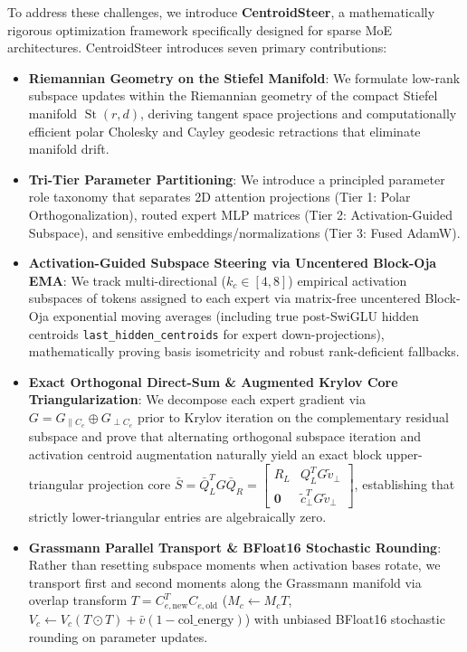 \documentclass[10pt,twocolumn,letterpaper]{article}
\begin{document}
To address these challenges, we introduce \textbf{CentroidSteer}, a mathematically rigorous optimization framework specifically designed for sparse MoE architectures. CentroidSteer introduces seven primary contributions:
\begin{itemize}
    \item \textbf{Riemannian Geometry on the Stiefel Manifold}: We formulate low-rank subspace updates within the Riemannian geometry of the compact Stiefel manifold $\operatorname{St}(r, d)$, deriving tangent space projections and computationally efficient polar Cholesky and Cayley geodesic retractions that eliminate manifold drift.
    \item \textbf{Tri-Tier Parameter Partitioning}: We introduce a principled parameter role taxonomy that separates 2D attention projections (Tier 1: Polar Orthogonalization), routed expert MLP matrices (Tier 2: Activation-Guided Subspace), and sensitive embeddings/normalizations (Tier 3: Fused AdamW).
    \item \textbf{Activation-Guided Subspace Steering via Uncentered Block-Oja EMA}: We track multi-directional ($k_c \in [4, 8]$) empirical activation subspaces of tokens assigned to each expert via matrix-free uncentered Block-Oja exponential moving averages (including true post-SwiGLU hidden centroids \texttt{last\_hidden\_centroids} for expert down-projections), mathematically proving basis isometricity and robust rank-deficient fallbacks.
    \item \textbf{Exact Orthogonal Direct-Sum \& Augmented Krylov Core Triangularization}: We decompose each expert gradient via $G = G_{\parallel C_e} \oplus G_{\perp C_e}$ prior to Krylov iteration on the complementary residual subspace and prove that alternating orthogonal subspace iteration and activation centroid augmentation naturally yield an exact block upper-triangular projection core $\bar{S} = \bar{Q}_L^T G \bar{Q}_R = \begin{bmatrix} R_L & Q_L^T G \tilde{v}_\perp \\ \mathbf{0} & \tilde{c}_\perp^T G \tilde{v}_\perp \end{bmatrix}$, establishing that strictly lower-triangular entries are algebraically zero.
    \item \textbf{Grassmann Parallel Transport \& BFloat16 Stochastic Rounding}: Rather than resetting subspace moments when activation bases rotate, we transport first and second moments along the Grassmann manifold via overlap transform $T = C_{e,\text{new}}^T C_{e,\text{old}}$ ($M_c \leftarrow M_c T$, $V_c \leftarrow V_c(T \odot T) + \bar{v}(1 - \text{col\_energy})$) with unbiased BFloat16 stochastic rounding on parameter updates.

\end{itemize}
\end{document}
